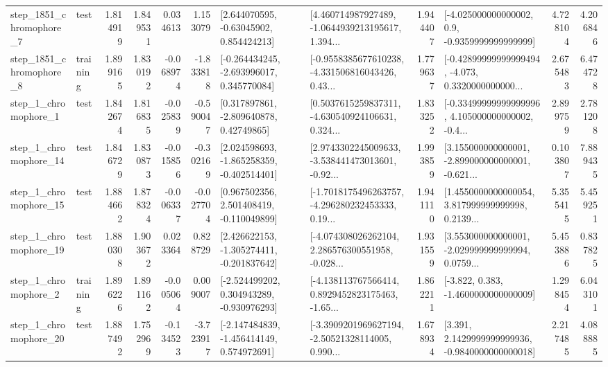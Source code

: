 \begin{tabular}{llrrrrllrlrr}
  step\_1851\_chromophore\_7 &      test &      1.814919 &    1.849531 &      0.034613 &  1.153079 &     [2.644070595, -0.63045902, 0.854424213] &  [4.460714987927489, -1.0644939213195617, 1.394... &       1.944407 &     [-4.025000000000002, 0.9, -0.9359999999999999] &            4.728104 &          4.206846 \\
  step\_1851\_chromophore\_8 &  training &      1.899165 &    1.830192 &     -0.068974 & -1.833818 &   [-0.264434245, -2.693996017, 0.345770084] &  [-0.9558385677610238, -4.331506816043426, 0.43... &       1.779637 &  [-0.42899999999999494, -4.073, 0.3320000000000... &            2.675483 &          6.474728 \\
     step\_1\_chromophore\_1 &      test &      1.842674 &    1.816835 &     -0.025839 & -0.590047 &     [0.317897861, -2.809640878, 0.42749865] &  [0.5037615259837311, -4.630540924106631, 0.324... &       1.833252 &  [-0.33499999999999996, 4.105000000000002, -0.4... &            2.899759 &          2.781208 \\
    step\_1\_chromophore\_14 &      test &      1.846729 &    1.830873 &     -0.015856 & -0.302169 &   [2.024598693, -1.865258359, -0.402514401] &  [2.9743302245009633, -3.538441473013601, -0.92... &       1.993859 &  [3.155000000000001, -2.899000000000001, -0.621... &            0.103807 &          7.889435 \\
    step\_1\_chromophore\_15 &      test &      1.884662 &    1.878324 &     -0.006337 & -0.027704 &    [0.967502356, 2.501408419, -0.110049899] &  [-1.7018175496263757, -4.296280232453333, 0.19... &       1.941110 &  [1.4550000000000054, 3.817999999999998, 0.2139... &            5.355415 &          5.459251 \\
    step\_1\_chromophore\_19 &      test &      1.880308 &    1.903672 &      0.023364 &  0.828729 &   [2.426622153, -1.305274411, -0.201837642] &  [-4.074308026262104, 2.286576300551958, -0.028... &       1.931559 &  [3.553000000000001, -2.029999999999994, 0.0759... &            5.453886 &          0.837825 \\
     step\_1\_chromophore\_2 &  training &      1.896226 &    1.891162 &     -0.005064 &  0.009007 &   [-2.524499202, 0.304943289, -0.930976293] &  [-4.138113767566414, 0.8929452823175463, -1.65... &       1.862211 &               [-3.822, 0.383, -1.4600000000000009] &            1.298454 &          6.043101 \\
    step\_1\_chromophore\_20 &      test &      1.887492 &    1.752969 &     -0.134523 & -3.723917 &   [-2.147484839, -1.456414149, 0.574972691] &  [-3.3909201969627194, -2.50521328114005, 0.990... &       1.678934 &   [3.391, 2.1429999999999936, -0.9840000000000018] &            2.217485 &          4.088885 \\

\end{tabular}
